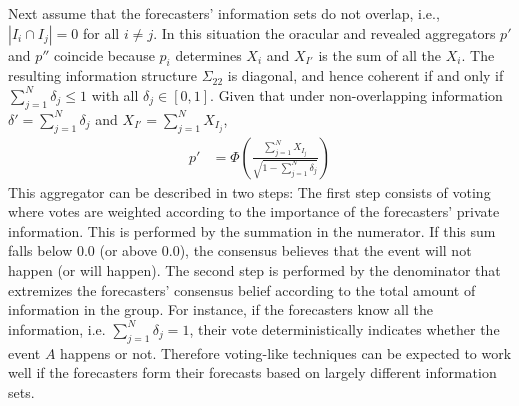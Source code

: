 \documentclass[11pt]{article}
\theoremstyle{definition}
\theoremstyle{definition}
\begin{document}
Next assume that the forecasters' information sets do not overlap, 
i.e., $|I_{i} \cap I_{j}| = 0$ for all $i \neq j$. 
In this situation the oracular and revealed aggregators $p'$ and $p''$
coincide because $p_i$ determines $X_i$ and $X_{I'}$ is the sum of
all the $X_i$.  The resulting information structure $\Sigma_{22}$ 
is diagonal, and hence coherent if and only if $\sum_{j=1}^N \delta_j \leq 1$ 
with all $\delta_j \in [0,1]$.  Given that under non-overlapping information 
$\delta' = \sum_{j=1}^N \delta_j$ and $X_{I'} = \sum_{j=1}^N X_{I_j}$, 
 \begin{align}
p' &= \Phi\left( \frac{\sum_{j=1}^N X_{I_j}}
  {\sqrt{1- \sum_{j=1}^N \delta_j}} \right) \label{vote}
\end{align}
This aggregator can be described in two steps: The first step consists of voting where votes are weighted according to the importance of the forecasters' private information. This is performed by the summation in the numerator. If this sum falls below $0.0$ (or above $0.0$), the consensus believes that the event will not happen (or will happen). The second step is performed by the denominator that extremizes the forecasters'  consensus belief according to the total amount of information in the group. For instance, if the forecasters know all the information, i.e. $\sum_{j=1}^N \delta_j = 1$, their vote deterministically indicates whether the event $A$ happens or not.  Therefore voting-like techniques can be expected to work well if the forecasters form their forecasts based on largely different information sets. 
\end{document}
